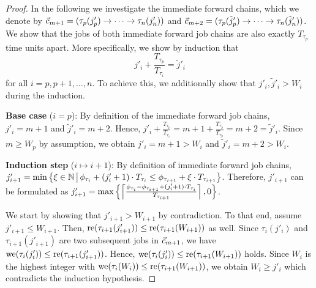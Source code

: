 \documentclass[10pt,conference]{resources/IEEEtran}
\theoremstyle{definition}
\newcommand{\fc}{\fw{c}}
\begin{document}
\begin{proof}
	In the following we investigate the immediate forward chains, which we denote by
	$\fc_{m+1} = (\tau_p(j'_p) \to\dots\to \tau_n(j'_n))$ and $\fc_{m+2} = (\tau_p(\tilde{j}'_p) \to\dots\to \tau_n({\tilde{j}'}_n))$.
	We show that the jobs of both immediate forward job chains are also exactly $T_{\tau_p}$ time units apart.
	More specifically, we show by induction that 
	\begin{equation}\label{eq:induction2}
		j'_i + \frac{T_{\tau_p}}{T_{\tau_i}} = \tilde{j}'_i
	\end{equation}
	for all $i=p, p{+}1, \dots, n$.
	To achieve this, we additionally show that $j'_i, \tilde{j}'_i > W_i$ during the induction.

	\textbf{Base case} ($i=p$):
	By definition of the immediate forward job chains, $j'_i = m+1 $ and $\tilde{j}'_i = m+2$.
	Hence, $j'_i + \frac{T_{\tau_p}}{T_{\tau_i}} = m +1 + \frac{T_{\tau_p}}{T_{\tau_p}} = m+2 = \tilde{j}'_i$.
	Since $m \geq W_p$ by assumption, we obtain $j'_i = m+1 > W_i$ and $\tilde{j}'_i = m+2 > W_i$.

	\textbf{Induction step} ($i \mapsto i+1$):
	By definition of immediate forward job chains, 
	$j'_{i+1} = \min \left\{\xi \in \mathbb{N} \,\middle|\, \phi_{\tau_i} + (j'_i +1) \cdot T_{\tau_i} \leq \phi_{\tau_{i+1}} + \xi \cdot T_{\tau_{i+1}}\right\}$.
	Therefore, $j'_{i+1}$ can be formulated as 
	$j'_{i+1} = \max\left\{{\left\lceil{\frac{\phi_{\tau_i} - \phi_{\tau_{i+1}} + (j'_i+1) \cdot T_{\tau_i}}{T_{\tau_{i+1}}}}\right\rceil , 0}\right\}$.
	
	We start by showing that $j'_{i+1}>W_{i+1}$ by contradiction.
	To that end, assume $j'_{i+1} \leq W_{i+1}$.
	Then, $\operatorname{re}(\tau_{i+1}(j'_{i+1})) \leq \operatorname{re}(\tau_{i+1}(W_{i+1}))$ as well.
	Since $\tau_i(j'_i)$ and $\tau_{i+1}(j'_{i+1})$ are two subsequent jobs in $\fc_{m+1}$, we have $\operatorname{we}(\tau_i(j'_i)) \leq \operatorname{re}(\tau_{i+1}(j'_{i+1}))$.
	Hence, $\operatorname{we}(\tau_i(j'_i)) \leq \operatorname{re}(\tau_{i+1}(W_{i+1}))$ holds.
	Since $W_i$ is the highest integer with $\operatorname{we}(\tau_i(W_i)) \leq \operatorname{re}(\tau_{i+1}(W_{i+1}))$, we obtain $W_i \geq j'_i$ which contradicts the induction hypothesis.


\end{proof}
\end{document}
